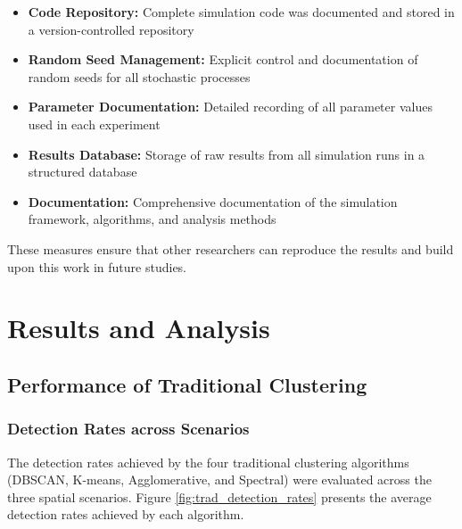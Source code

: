 \begin{itemize}
    \item \textbf{Code Repository:} Complete simulation code was documented and stored in a version-controlled repository
    
    \item \textbf{Random Seed Management:} Explicit control and documentation of random seeds for all stochastic processes
    
    \item \textbf{Parameter Documentation:} Detailed recording of all parameter values used in each experiment
    
    \item \textbf{Results Database:} Storage of raw results from all simulation runs in a structured database
    
    \item \textbf{Documentation:} Comprehensive documentation of the simulation framework, algorithms, and analysis methods
\end{itemize}

These measures ensure that other researchers can reproduce the results and build upon this work in future studies.


\chapter{Results and Analysis}

\section{Performance of Traditional Clustering}

\subsection{Detection Rates across Scenarios}

The detection rates achieved by the four traditional clustering algorithms (DBSCAN, K-means, Agglomerative, and Spectral) were evaluated across the three spatial scenarios. Figure \ref{fig:trad_detection_rates} presents the average detection rates achieved by each algorithm.

